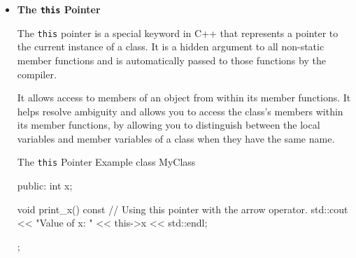 \begin{itemize}
\begin{neonlisting}[language=C++]{Const Members Example}
{    void print_value() const {
        // value *= 2; // Illegal!
        std::cout << "Const version: " << value << std::endl;
    }
    
    const int value;
};
\end{neonlisting}

    \begin{warningblock}
        If you have a \texttt{const} member function but need to modify a member variable, you can declare that variable as \texttt{mutable} (could be dangerous).
    \end{warningblock}

    \begin{neonlisting}[language=C++]{Const vs Non-Const Member Functions Example}
class MyClass {
public:
    void print() {
        std::cout << "Non-const version" << std::endl;
    }

    void print() const {
        std::cout << "Const version" << std::endl;
    }
};

MyClass obj1;       // Create a non-const object.
const MyClass obj2; // Create a const object.

obj1.print(); // Calls the non-const version.
obj2.print(); // Calls the const version.
\end{neonlisting}

    \item \textbf{The \texttt{this} Pointer}
    
    The \texttt{this} pointer is a special keyword in C++ that represents a pointer to the current instance of a class. It is a hidden argument to all non-static member functions and is automatically passed to those functions by the compiler.
    
    It allows access to members of an object from within its member functions. It helps resolve ambiguity and allows you to access the class's members within its member functions, by allowing you to distinguish between the local variables and member variables of a class when they have the same name.
    
    \begin{neonlisting}[language=C++]{The \texttt{this} Pointer Example}
class MyClass {
public:
    int x;

    void print_x() const {
        // Using this pointer with the arrow operator.
        std::cout << "Value of x: " << this->x << std::endl;
    }
};
\end{neonlisting}
\end{itemize}

